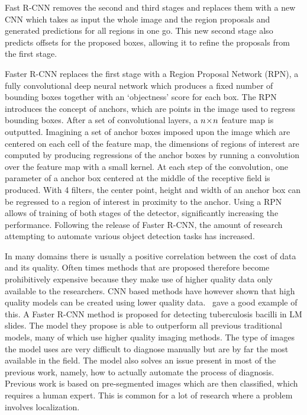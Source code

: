 Fast R-CNN removes the second and third stages and replaces them with a new CNN which takes as input the whole image and the region proposals and generated predictions for all regions in one go.
This new second stage also predicts offsets for the proposed boxes, allowing it to refine the proposals from the first stage.

Faster R-CNN replaces the first stage with a Region Proposal Network (RPN), a fully convolutional deep neural network which produces a fixed number of bounding boxes together with an `objectness' score for each box.
The RPN introduces the concept of anchors, which are points in the image used to regress bounding boxes.
After a set of convolutional layers, a \(n\!\times \! n\) feature map is outputted.
Imagining a set of anchor boxes imposed upon the image which are centered on each cell of the feature map, the dimensions of regions of interest are computed by producing regressions of the anchor boxes by running a convolution over the feature map with a small kernel.
At each step of the convolution, one parameter of a anchor box centered at the middle of the receptive field is produced.
With 4 filters, the center point, height and width of an anchor box can be regressed to a region of interest in proximity to the anchor.
Using a RPN allows of training of both stages of the detector, significantly increasing the performance.
Following the release of Faster R-CNN, the amount of research attempting to automate various object detection tasks has increased.

In many domains there is usually a positive correlation between the cost of data and its quality.
Often times methods that are proposed therefore become prohibitively expensive because they make use of higher quality data only available to the researchers.
CNN based methods have however shown that high quality models can be created using lower quality data.\ \textcite{el_melegy_automatic_2019} gave a good example of this.
A Faster R-CNN method is proposed for detecting tuberculosis bacilli in LM slides.
The model they propose is able to outperform all previous traditional models, many of which use higher quality imaging methods.
The type of images the model uses are very difficult to diagnose manually but are by far the most available in the field.
The model also solves an issue present in most of the previous work, namely, how to actually automate the process of diagnosis.
Previous work is based on pre-segmented images which are then classified, which requires a human expert.
This is common for a lot of research where a problem involves localization.

